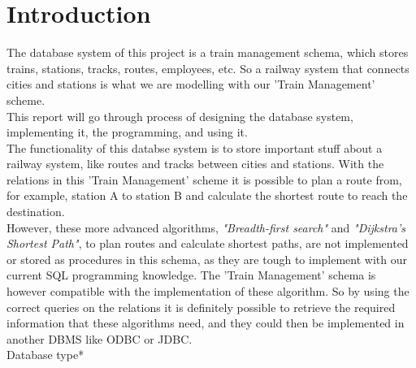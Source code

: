 \section{Introduction}

The database system of this project is a train management schema, which stores trains, stations, tracks, routes, employees, etc. So a railway system that connects cities and stations is what we are modelling with our 'Train Management' scheme.\\
This report will go through process of designing the database system, implementing it, the programming, and using it.\\[12pt]
The functionality of this databse system is to store important stuff about a railway system, like routes and tracks between cities and stations. With the relations in this 'Train Management' scheme it is possible to plan a route from, for example, station A to station B and calculate the shortest route to reach the destination.\\ However, these more advanced algorithms, \textit{"Breadth-first search"} and \textit{"Dijkstra's Shortest Path"}, to plan routes and calculate shortest paths, are not implemented or stored as procedures in this schema, as they are tough to implement with our current SQL programming knowledge.
The 'Train Management' schema is however compatible with the implementation of these algorithm. So by using the correct queries on the relations it is definitely possible to retrieve the required information that these algorithms need, and they could then be implemented in another DBMS like ODBC or JDBC.\\[12pt]
Database type*

